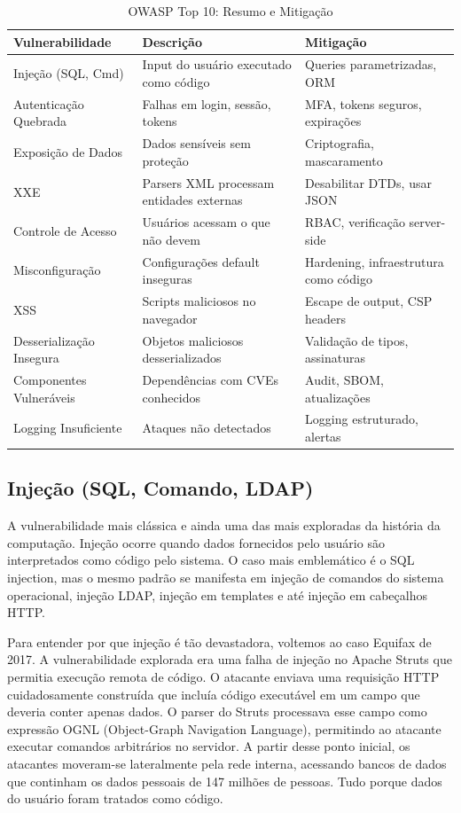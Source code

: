 \begin{table}[htbp]
\centering
\caption{OWASP Top 10: Resumo e Mitigação}
\small
\begin{tabular}{@{}p{3.8cm}p{4.2cm}p{4.5cm}@{}}
\toprule
\textbf{Vulnerabilidade} & \textbf{Descrição} & \textbf{Mitigação} \\
\midrule
Injeção (SQL, Cmd) & Input do usuário executado como código &
    Queries parametrizadas, ORM \\
Autenticação Quebrada & Falhas em login, sessão, tokens &
    MFA, tokens seguros, expirações \\
Exposição de Dados & Dados sensíveis sem proteção &
    Criptografia, mascaramento \\
XXE & Parsers XML processam entidades externas &
    Desabilitar DTDs, usar JSON \\
Controle de Acesso & Usuários acessam o que não devem &
    RBAC, verificação server-side \\
Misconfiguração & Configurações default inseguras &
    Hardening, infraestrutura como código \\
XSS & Scripts maliciosos no navegador &
    Escape de output, CSP headers \\
Desserialização Insegura & Objetos maliciosos desserializados &
    Validação de tipos, assinaturas \\
Componentes Vulneráveis & Dependências com CVEs conhecidos &
    Audit, SBOM, atualizações \\
Logging Insuficiente & Ataques não detectados &
    Logging estruturado, alertas \\
\bottomrule
\end{tabular}
\end{table}

\subsection{Injeção (SQL, Comando, LDAP)}

A vulnerabilidade mais clássica e ainda uma das mais exploradas da história da
computação. Injeção ocorre quando dados fornecidos pelo usuário são interpretados
como código pelo sistema. O caso mais emblemático é o SQL injection, mas o mesmo
padrão se manifesta em injeção de comandos do sistema operacional, injeção LDAP,
injeção em templates e até injeção em cabeçalhos HTTP.

Para entender por que injeção é tão devastadora, voltemos ao caso Equifax de
2017. A vulnerabilidade explorada era uma falha de injeção no Apache Struts que
permitia execução remota de código. O atacante enviava uma requisição HTTP
cuidadosamente construída que incluía código executável em um campo que deveria
conter apenas dados. O parser do Struts processava esse campo como expressão
OGNL (Object-Graph Navigation Language), permitindo ao atacante executar
comandos arbitrários no servidor. A partir desse ponto inicial, os atacantes
moveram-se lateralmente pela rede interna, acessando bancos de dados que
continham os dados pessoais de 147 milhões de pessoas. Tudo porque dados
do usuário foram tratados como código.

